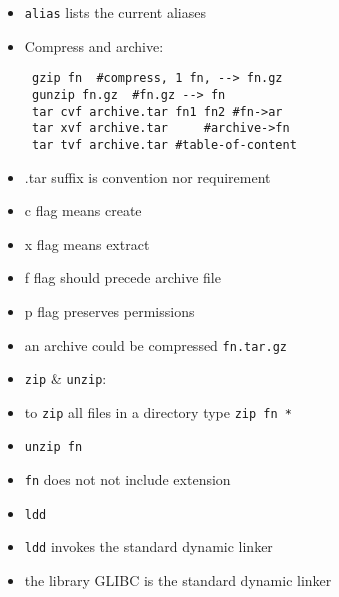 \documentclass[twocolumn]{IEEEtran} %
\begin{document}
\begin{itemize}
        \item \verb|alias| lists the current aliases
    \ei
    \item Compress and archive:
    \begin{verbatim}
 gzip fn  #compress, 1 fn, --> fn.gz
 gunzip fn.gz  #fn.gz --> fn
 tar cvf archive.tar fn1 fn2 #fn->ar
 tar xvf archive.tar     #archive->fn
 tar tvf archive.tar #table-of-content
    \end{verbatim}
    \bi
        \item .tar suffix is convention nor requirement
        \item c flag means create
        \item x flag means extract
        \item f flag should precede archive file
        \item p flag preserves permissions
        \item an archive could be compressed \verb|fn.tar.gz|
    \ei
    \item \verb|zip| \& \verb|unzip|:
    \bi
        \item to \verb|zip| all files in a directory type \newline \verb|zip fn *|
        \item \verb|unzip fn|
        \item \verb|fn| does not not include extension
    \ei
    \item \verb|ldd|
    \bi
        \item  \verb|ldd| invokes the standard dynamic linker
        \item the library GLIBC is the standard dynamic linker
    \ei
\end{itemize}

\newpage
\end{document}
